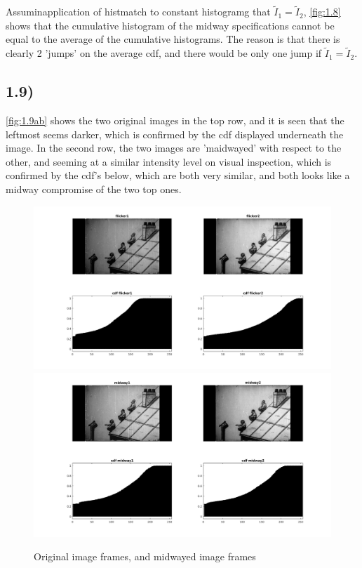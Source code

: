 \documentclass[a4paper]{article}
\begin{document}
Assuminapplication of histmatch to constant histogramg that $\tilde{I}_1 = \tilde{I}_2$, \autoref{fig:1.8} shows that the cumulative histogram of the midway specifications cannot be equal to the average of the cumulative histograms. The reason is that there is clearly 2 'jumps' on the average cdf, and there would be only one jump if $\tilde{I}_1 = \tilde{I}_2$.

\newpage
\subsection*{1.9)}

\autoref{fig:1.9ab} shows the two original images in the top row, and it is seen that the leftmost seems darker, which is confirmed by the cdf displayed underneath the image.
In the second row, the two images are 'maidwayed' with respect to the other, and seeming at a similar intensity level on visual inspection, which is confirmed by the cdf's below, which are both very similar, and both looks like a midway compromise of the two top ones.

\begin{figure}[h!]
  \centering
  \includegraphics[width=0.8\linewidth, trim={35mm 0mm 35mm 0mm }, clip=true]{./1_9a.png}
  \includegraphics[width=0.8\linewidth, trim={35mm 0mm 35mm 0mm }, clip=true]{./1_9b.png}
  \caption{Original image frames, and midwayed image frames}
  \label{fig:1.9ab}
\end{figure}
\end{document}
